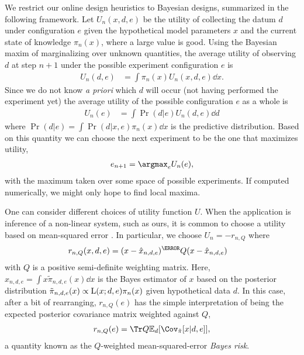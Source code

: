 \documentclass[aps,nofootinbib,twocolumn,superscriptaddress]{revtex4}
\newcommand{\mps}{x}
\newcommand{\eps}{e}
\newcommand{\data}{d}
\begin{document}
We restrict our online design heuristics to Bayesian designs,
summarized in the following framework.
Let $U_n(\mps,\data,\eps)$ be the utility of collecting the datum
$\data$ under configuration $\eps$ given the hypothetical
model parameters $\mps$ and the current state of knowledge $\pi_n(\mps)$,
where a large value is good.
Using the Bayesian maxim of marginalizing over unknown quantities,
the average utility of observing $\data$ at step $n+1$ under
the possible experiment configuration $\eps$ is
\begin{align}
    U_n(\data,\eps)
        &= \int \pi_n(\mps)U_n(\mps,\data,\eps)\dd\mps.
\end{align}
Since we do not know \textit{a priori} which $\data$ will
occur (not having performed the experiment yet) the average
utility of the possible configuration $\eps$ as a whole is
\begin{align}
    U_n(\eps)
        &= \int\Pr(\data|\eps)U_n(\data,\eps) \dd\data
\end{align}
where $\Pr(\data|\eps)=\int \Pr(\data|\mps,\eps)\pi_n(\mps)\dd\mps$ is the
predictive distribution.
Based on this quantity we can choose the next experiment to be
the one that maximizes utility,
\begin{align}
    \eps_{n+1} = \argmax_\eps U_n(\eps),
\end{align}
with the maximum taken over some space of possible experiments.
If computed numerically, we might only hope to find local maxima.

One can consider different choices of utility function $U$.
When the application is inference of a non-linear system, such as
ours, it is common to choose a utility based on
mean-squared error \cite{chaloner_bayesian_1995}.
In particular, we choose $U_n=-r_{n,Q}$ where
\begin{align}
    r_{n,Q}(\mps,\data,\eps)
        &= (\mps - \hat\mps_{n,\data,\eps})^\T Q (\mps - \hat\mps_{n,\data,\eps})
\end{align}
with $Q$ is a positive semi-definite weighting matrix.
Here, $\hat{\mps}_{n,\data,\eps}=\int \mps \tilde{\pi}_{n,\data,\eps}(\mps)\dd\mps$
is the Bayes estimator of $\mps$ based on the posterior distribution
$\tilde{\pi}_{n,\data,\eps}(\mps)\propto \Lhood(\mps;\data,\eps)\pi_n(\mps)$
given hypothetical data $\data$.
In this case, after a bit of rearranging,
$r_{n,Q}(\eps)$ has the simple interpretation
of being the expected posterior covariance matrix weighted
against $Q$,
\begin{align}
    r_{n,Q}(\eps) = \Tr Q\expect_\data[\Cov_{\tilde{\pi}}
        [\mps|\data,\eps]],
    \label{eq:bayes-risk}
\end{align}
a quantity known as the $Q$-weighted
mean-squared-error \textit{Bayes risk}.
\end{document}
